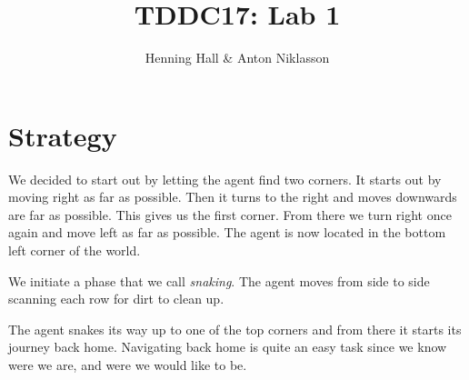 \documentclass{article}
\begin{document}
\title{TDDC17: Lab 1}
\author{Henning Hall \& Anton Niklasson}
\maketitle

\section{Strategy}

We decided to start out by letting the agent find two corners. It starts out by moving right as far as possible.
Then it turns to the right and moves downwards are far as possible. This gives us the first corner.
From there we turn right once again and move left as far as possible. The agent is now located in the bottom left corner of the world.

We initiate a phase that we call \textit{snaking}. The agent moves from side to side scanning each row for dirt to clean up.

The agent snakes its way up to one of the top corners and from there it starts its journey back home. Navigating back home is quite an easy task since we know
were we are, and were we would like to be.
\end{document}
